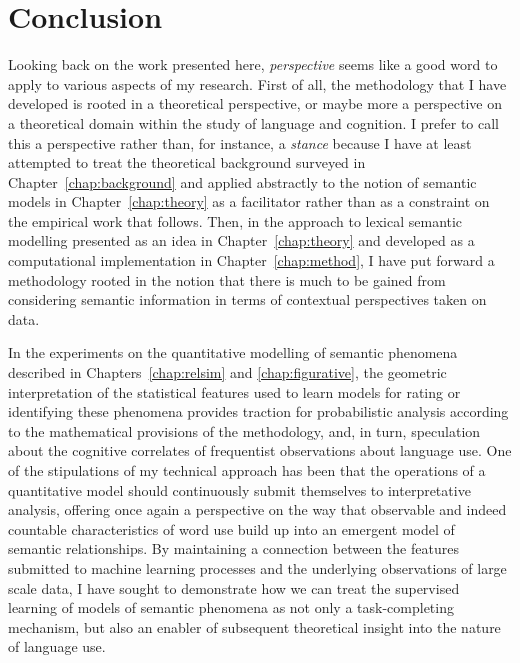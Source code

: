 \chapter{Conclusion}
Looking back on the work presented here, \emph{perspective} seems like a good word to apply to various aspects of my research.  First of all, the methodology that I have developed is rooted in a theoretical perspective, or maybe more a perspective on a theoretical domain within the study of language and cognition.  I prefer to call this a perspective rather than, for instance, a \emph{stance} because I have at least attempted to treat the theoretical background surveyed in Chapter~\ref{chap:background} and applied abstractly to the notion of semantic models in Chapter~\ref{chap:theory} as a facilitator rather than as a constraint on the empirical work that follows.  Then, in the approach to lexical semantic modelling presented as an idea in Chapter~\ref{chap:theory} and developed as a computational implementation in Chapter~\ref{chap:method}, I have put forward a methodology rooted in the notion that there is much to be gained from considering semantic information in terms of contextual perspectives taken on data.

In the experiments on the quantitative modelling of semantic phenomena described in Chapters~\ref{chap:relsim} and \ref{chap:figurative}, the geometric interpretation of the statistical features used to learn models for rating or identifying these phenomena provides traction for probabilistic analysis according to the mathematical provisions of the methodology, and, in turn, speculation about the cognitive correlates of frequentist observations about language use.  One of the stipulations of my technical approach has been that the operations of a quantitative model should continuously submit themselves to interpretative analysis, offering once again a perspective on the way that observable and indeed countable characteristics of word use build up into an emergent model of semantic relationships.  By maintaining a connection between the features submitted to machine learning processes and the underlying observations of large scale data, I have sought to demonstrate how we can treat the supervised learning of models of semantic phenomena as not only a task-completing mechanism, but also an enabler of subsequent theoretical insight into the nature of language use.

